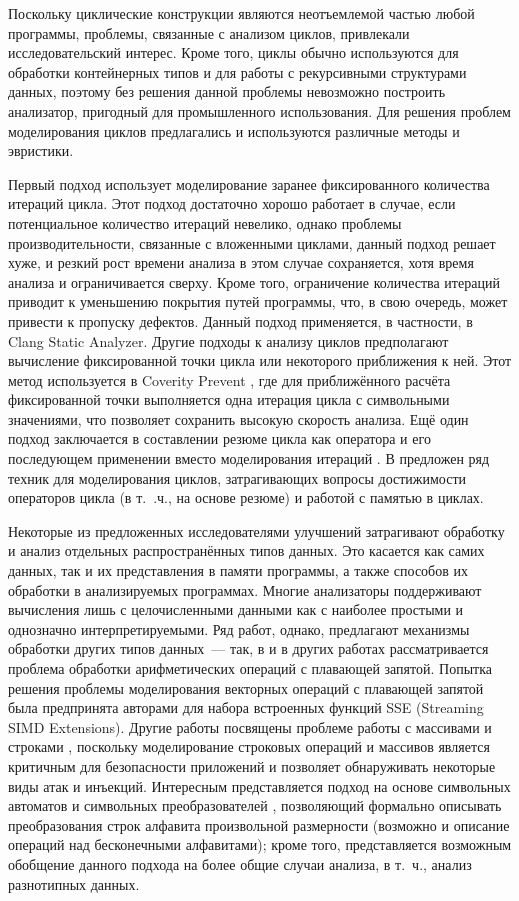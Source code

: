 Поскольку циклические конструкции являются неотъемлемой частью любой программы, проблемы, связанные с анализом циклов, привлекали исследовательский интерес. Кроме того, циклы обычно используются для обработки контейнерных типов и для работы с рекурсивными структурами данных, поэтому без решения данной проблемы невозможно построить анализатор, пригодный для промышленного использования. Для решения проблем моделирования циклов предлагались и используются различные методы и эвристики. 

Первый подход использует моделирование заранее фиксированного количества итераций цикла. Этот подход достаточно хорошо работает в случае, если потенциальное количество итераций невелико, однако проблемы производительности, связанные с вложенными циклами, данный подход решает хуже, и резкий рост времени анализа в этом случае сохраняется, хотя время анализа и ограничивается сверху. Кроме того, ограничение количества итераций приводит к уменьшению покрытия путей программы, что, в свою очередь, может привести к пропуску дефектов. Данный подход применяется, в частности, в Clang Static Analyzer. Другие подходы к анализу циклов предполагают вычисление фиксированной точки цикла или некоторого приближения к ней. Этот метод используется в Coverity Prevent \cite{coverity-billion}, где для приближённого расчёта фиксированной точки выполняется одна итерация цикла с символьными значениями, что позволяет сохранить высокую скорость анализа. Ещё один подход заключается в составлении резюме цикла как оператора и его последующем применении вместо моделирования итераций \cite{loopfrog-summary, godefroid-loop-summary}. В \cite{trtik-thesis} предложен ряд техник для моделирования циклов, затрагивающих вопросы достижимости операторов цикла (в т.~.ч., на основе резюме) и работой с памятью в циклах.

Некоторые из предложенных исследователями улучшений затрагивают обработку и анализ отдельных распространённых типов данных. Это касается как самих данных, так и их представления в памяти программы, а также способов их обработки в анализируемых программах. Многие анализаторы поддерживают вычисления лишь с целочисленными данными как с наиболее простыми и однозначно интерпретируемыми. Ряд работ, однако, предлагают механизмы обработки других типов данных~--- так, в \cite{sym-fp,sym-fp-dotnet} и в других работах рассматривается проблема обработки арифметических операций с плавающей запятой. Попытка решения проблемы моделирования векторных операций с плавающей запятой была предпринята авторами \cite{sym-fp-sse} для набора встроенных функций SSE (Streaming SIMD Extensions). Другие работы посвящены проблеме работы с массивами и строками \cite{str-csharp,str-sql}, поскольку моделирование строковых операций и массивов является критичным для безопасности приложений и позволяет обнаруживать некоторые виды атак и инъекций. Интересным представляется подход на основе символьных автоматов и символьных преобразователей \cite{sym-automata-appl,sym-automata-constraints}, позволяющий формально описывать преобразования строк алфавита произвольной размерности (возможно и описание операций над бесконечными алфавитами); кроме того, представляется возможным обобщение данного подхода на более общие случаи анализа, в т.~ч., анализ разнотипных данных.

